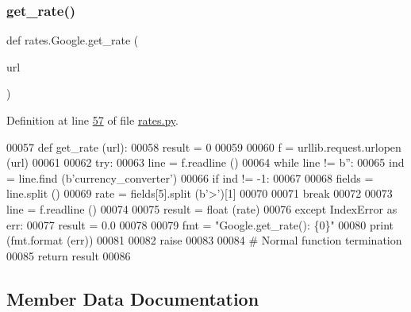\subsubsection{\texorpdfstring{get\+\_\+rate()}{get\_rate()}}
{\footnotesize\ttfamily def rates.\+Google.\+get\+\_\+rate (\begin{DoxyParamCaption}\item[{}]{url }\end{DoxyParamCaption})}



Definition at line \hyperlink{rates_8py_source_l00057}{57} of file \hyperlink{rates_8py_source}{rates.\+py}.


\begin{DoxyCode}
00057     \textcolor{keyword}{def }get\_rate (url):
00058         result = 0
00059     
00060         f = urllib.request.urlopen (url)
00061         
00062         \textcolor{keywordflow}{try}:
00063             line = f.readline ()
00064             \textcolor{keywordflow}{while} line != b\textcolor{stringliteral}{''}:
00065                 ind = line.find (b\textcolor{stringliteral}{'currency\_converter'})
00066                 \textcolor{keywordflow}{if} ind != -1:
00067                     
00068                     fields = line.split ()
00069                     rate = fields[5].split (b\textcolor{stringliteral}{'>'})[1]
00070                     
00071                     \textcolor{keywordflow}{break}
00072                     
00073                 line = f.readline ()
00074             
00075             result = float (rate)
00076         \textcolor{keywordflow}{except} IndexError \textcolor{keyword}{as} err:
00077             result = 0.0
00078             
00079             fmt = \textcolor{stringliteral}{"Google.get\_rate(): \{0\}"}
00080             \textcolor{keywordflow}{print} (fmt.format (err))
00081             
00082             \textcolor{keywordflow}{raise}
00083         
00084         \textcolor{comment}{# Normal function termination}
00085         \textcolor{keywordflow}{return} result
00086 
\end{DoxyCode}


\subsection{Member Data Documentation}
\mbox{\label{classrates_1_1_google_a0979ffcb18b8bf3156cc5735c67ca6df}} 
